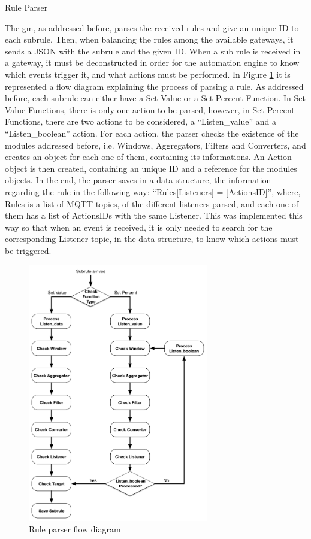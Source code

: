 \begin{Paragraph}{Rule Parser}

The \ac{gm}, as addressed before, parses the received rules and give an unique ID to each subrule. Then, when balancing the rules among the available gateways, it sends a JSON with the subrule and the given ID. When a sub rule is received in a gateway, it must be deconstructed in order for the automation engine to know which events trigger it, and what actions must be performed. In Figure \ref{fig:parse} it is represented a flow diagram explaining the process of parsing a rule. As addressed before, each subrule can either have a Set Value or a Set Percent Function. In Set Value Functions, there is only one action to be parsed, however, in Set Percent Functions, there are two actions to be considered, a ``Listen\_value'' and a ``Listen\_boolean'' action. For each action, the parser checks the existence of the modules addressed before, i.e. Windows, Aggregators, Filters and Converters, and creates an object for each one of them, containing its informations. An Action object is then created, containing an unique ID and a reference for the modules objects. In the end, the parser saves in a data structure, the information regarding the rule in the following way: ``Rules[Listeners] = [ActionsID]'', where, Rules is a list of MQTT topics, of the different listeners parsed, and each one of them has a list of ActionsIDs with the same Listener. This was implemented this way so that when an event is received, it is only needed to search for the corresponding Listener topic, in the data structure, to know which actions must be triggered. 


\begin{figure}[H]
	\centering
	\includegraphics[width=0.7\textwidth]{figures/parseRule.png}
	\caption{Rule parser flow diagram}
	\label{fig:parse}
\end{figure}

\end{Paragraph}

